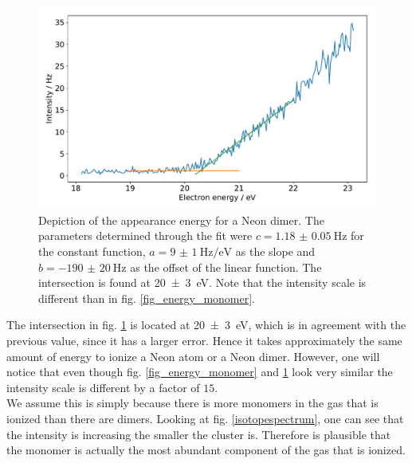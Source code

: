 \documentclass[a4paper,10pt]{article}
\begin{document}
\begin{figure}[H]
	\centering
	\includegraphics[width = 0.8 \textwidth]{energy_ne2.pdf}
	\caption{Depiction of the appearance energy for a Neon dimer. The parameters determined through the fit were $c = \SI{1.18(5)}{\hertz}$ for the constant function, $a = \SI{9(1)}{\hertz \per \electronvolt}$ as the slope and $b = \SI{-190(20)}{\hertz}$ as the offset of the linear function. The intersection is found at \SI{20(3)}{\electronvolt}. Note that the intensity scale is different than in fig. \ref{fig_energy_monomer}. }
	\label{fig_energy_dimer}
\end{figure}
The intersection in fig. \ref{fig_energy_dimer} is located at \SI{20(3)}{\electronvolt}, which is in agreement with the previous value, since it has a larger error. Hence it takes approximately the same amount of energy to ionize a Neon atom or a Neon dimer. However, one will notice that even though fig. \ref{fig_energy_monomer} and \ref{fig_energy_dimer} look very similar the intensity scale is different by a factor of $15$. \\
We assume this is simply because there is more monomers in the gas that is ionized than there are dimers. Looking at fig. \ref{isotopespectrum}, one can see that the intensity is increasing the smaller the cluster is. Therefore is plausible that the monomer is actually the most abundant component of the gas that is ionized.
\end{document}
